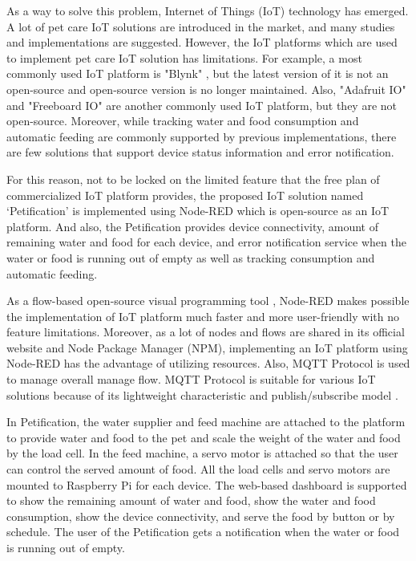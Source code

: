 \documentclass[conference]{IEEEtran}
\begin{document}
As a way to solve this problem, Internet of Things (IoT) technology has emerged. A lot of pet care IoT solutions are introduced in the market, and many studies and implementations are suggested.
However, the IoT platforms which are used to implement pet care IoT solution has limitations. For example, a most commonly used IoT platform is "Blynk" \cite{b2, b3, b4, b5}, but the latest version of it is not an open-source and open-source version is no longer maintained. Also, "Adafruit IO" \cite{b6} and "Freeboard IO" \cite{b7} are another commonly used IoT platform, but they are not open-source.
Moreover, while tracking water and food consumption and automatic feeding are commonly supported by previous implementations, there are few solutions that support device status information and error notification.

For this reason, not to be locked on the limited feature that the free plan of commercialized IoT platform provides, the proposed IoT solution named ‘Petification’ is implemented using Node-RED which is open-source as an IoT platform. And also, the Petification provides device connectivity, amount of remaining water and food for each device, and error notification service when the water or food is running out of empty as well as tracking consumption and automatic feeding.

As a flow-based open-source visual programming tool \cite{b8}, Node-RED makes possible the implementation of IoT platform much faster and more user-friendly with no feature limitations. Moreover, as a lot of nodes and flows are shared in its official website and Node Package Manager (NPM), implementing an IoT platform using Node-RED has the advantage of utilizing resources. Also, MQTT Protocol is used to manage overall manage flow. MQTT Protocol is suitable for various IoT solutions because of its lightweight characteristic and publish/subscribe model \cite{b9}.

In Petification, the water supplier and feed machine are attached to the platform to provide water and food to the pet and scale the weight of the water and food by the load cell. In the feed machine, a servo motor is attached so that the user can control the served amount of food. All the load cells and servo motors are mounted to Raspberry Pi for each device.
The web-based dashboard is supported to show the remaining amount of water and food, show the water and food consumption, show the device connectivity, and serve the food by button or by schedule. The user of the Petification gets a notification when the water or food is running out of empty.
\end{document}
